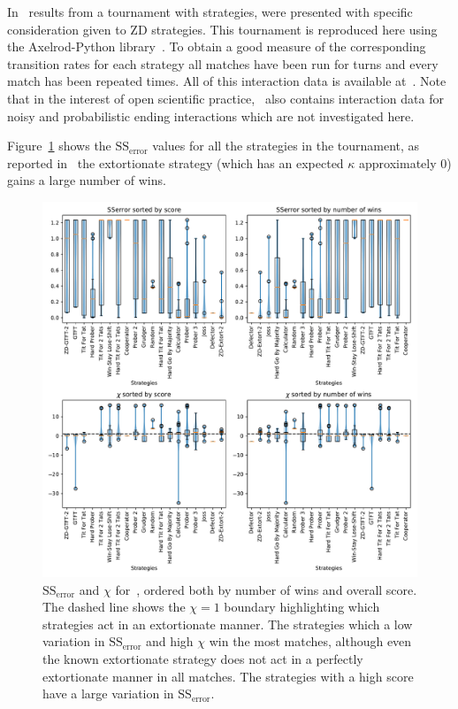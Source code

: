 \documentclass[a4paper]{article}
\newcommand{\SSe}{\text{SS}_{\text{error}}}
\begin{document}
In~\cite{Stewart2012} results from a tournament with
 strategies,
were presented with specific consideration given to ZD strategies. This
tournament is reproduced here using the Axelrod-Python
library~\cite{Knight2016}. To obtain a good measure of the corresponding
transition rates for each strategy all matches have been run for
turns and every match has been
repeated times. All of this
interaction data is available at~\cite{vincent_knight_2018_1297075}. Note that
in the interest of open scientific practice,~\cite{vincent_knight_2018_1297075}
also contains interaction data for noisy and probabilistic ending interactions
which are not investigated here.

Figure~\ref{fig:sserror_in_stewart_plotkin} shows the
\(\SSe\) values for all the strategies in the tournament, as
reported in~\cite{Stewart2012} the extortionate strategy (which has an expected
\(\kappa\) approximately 0) gains a large number of wins.

\begin{figure}[!htbp]
    \centering
    \includegraphics[width=.8\textwidth]{./assets/img/sserror_in_stewart_plotkin/main.pdf}
    \caption{\(\SSe\) and \(\chi\) for~\cite{Stewart2012},
        ordered both by number of wins and overall score. The dashed line shows
        the \(\chi=1\) boundary highlighting which strategies act in an
        extortionate manner. The strategies which a low variation in
        \(\SSe\) and high \(\chi\) win the most matches, although even the known
        extortionate strategy does not act in a perfectly extortionate manner in
        all matches. The strategies with a high score have a large variation in
        \(\SSe\).
        }
    \label{fig:sserror_in_stewart_plotkin}
\end{figure}
\end{document}
